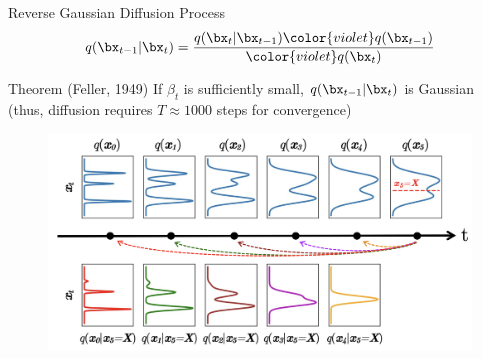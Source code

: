 \documentclass{beamer}
\begin{document}
\begin{frame}{Reverse Gaussian Diffusion Process}
	\vspace{-0.4cm}
	\[
		q(\bx_{t-1}|\bx_{t}) = \frac{q(\bx_{t}|\bx_{t-1}) {\color{violet}q(\bx_{t-1})}}{{\color{violet}q(\bx_{t})}} 
	\]
	\vspace{-0.4cm}
	\begin{block}{Theorem (Feller, 1949)}
		If $\beta_t$ is sufficiently small, $q(\bx_{t-1}|\bx_t)$ is Gaussian {\color{gray}(thus, diffusion requires $T \approx 1000$ steps for convergence)}
	\end{block}
	\eqpause
	\vspace{-0.3cm}
	\begin{figure}
		\includegraphics[width=0.7\linewidth]{figs/inverse_distr_1d}
	\end{figure}
\end{frame} 
\end{document}
